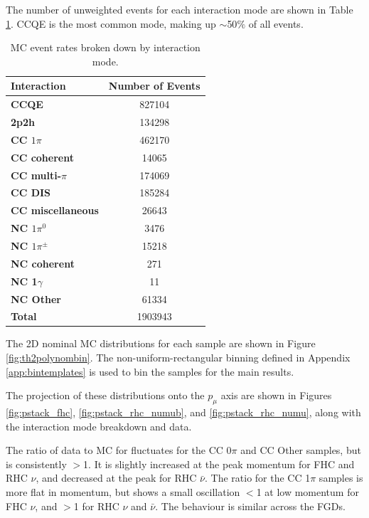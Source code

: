 The number of unweighted events for each interaction mode are shown in Table \ref{tab:modes}. CCQE is the most common mode, making up $\sim$50$\%$ of all events.

\begin{center}
\begin{table}[!htbp]
\center
\begin{tabular}{l||c}
\hline \hline
\textbf{Interaction} & \textbf{Number of Events}\\
\hline
\hline
\textbf{CCQE} & 827104 \\
\textbf{2p2h} & 134298 \\
\textbf{CC $1\pi$} & 462170 \\
\textbf{CC coherent} & 14065 \\
\textbf{CC multi-$\pi$} & 174069 \\
\textbf{CC DIS} & 185284 \\
\textbf{CC miscellaneous} & 26643 \\
\textbf{NC $1\pi^0$} & 3476 \\
\textbf{NC $1\pi^{\pm}$} & 15218 \\
\textbf{NC coherent} & 271 \\
\textbf{NC 1$\gamma$} & 11 \\
\textbf{NC Other} & 61334 \\ \hline
\textbf{Total} & 1903943\\ \hline\hline
\end{tabular}
\caption{MC event rates broken down by interaction mode.}
\label{tab:modes}
\end{table}
\end{center}
\vspace{-1cm}

The 2D nominal MC distributions for each sample are shown in Figure \ref{fig:th2polynombin}. The non-uniform-rectangular binning defined in Appendix \ref{app:bintemplates} is used to bin the samples for the main results. 

The projection of these distributions onto the $p_{\mu}$ axis are shown in Figures \ref{fig:pstack_fhc}, \ref{fig:pstack_rhc_numub}, and \ref{fig:pstack_rhc_numu}, along with the interaction mode breakdown and data.

The ratio of data to MC for fluctuates for the CC 0$\pi$ and CC Other samples, but is consistently $>$1. It is slightly increased at the peak momentum for FHC and RHC $\nu$, and decreased at the peak for RHC $\bar{\nu}$. The ratio for the CC 1$\pi$ samples is more flat in momentum, but shows a small oscillation $<$1 at low momentum for FHC $\nu$, and $>$1 for RHC $\nu$ and $\bar{\nu}$. The behaviour is similar across the FGDs.

